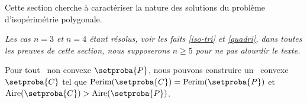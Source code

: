 Cette section cherche à caractériser la nature des solutions du problème d’isopérimétrie polygonale.

\begin{tcolorbox}
	\itshape\small
	Les cas $n = 3$ et $n = 4$ étant résolus, voir les faits \ref{iso-tri} et \ref{quadri}, dans toutes les preuves de cette section, nous supposerons $n \geq 5$ pour ne pas alourdir le texte.
\end{tcolorbox}




\begin{fact} \label{must-be-conv}
    Pour tout \ngone\ non convexe $\setproba{P}$,
	nous pouvons construire un \ngone\ convexe $\setproba{C}$ tel que
	$\perim{\setproba{C}} = \perim{\setproba{P}}$
	et
	$\area{\setproba{C}} > \area{\setproba{P}}$.
\end{fact}



